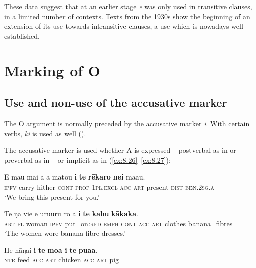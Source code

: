 {These data suggest that at an earlier stage \textit{e} was only used in transitive clauses, in a limited number of contexts. Texts from the 1930s show the beginning of an extension of its use towards intransitive clauses, a use which is nowadays well established.

\section{Marking of O}\label{sec:8.4}
\subsection{Use and non-use of the accusative marker}\label{sec:8.4.1}
The O argument is normally preceded by the accusative marker \textit{i}. With certain verbs, \textit{ki} is used as well (). 

The accusative marker is used whether A is expressed – postverbal as in  or preverbal as in  – or implicit as in (\ref{ex:8.26}–\ref{ex:8.27}):

\ea\label{ex:8.24}
\gll E ma{\ꞌ}u mai {\ꞌ}ā a mātou \textbf{i} \textbf{te} \textbf{rēkaro} \textbf{nei} mā{\ꞌ}au.\\
\textsc{ipfv} carry hither \textsc{cont} \textsc{prop} \textsc{1pl.excl} \textsc{acc} \textsc{art} present \textsc{dist} \textsc{ben.2sg.a}\\

\glt 
‘We bring this present for you.’ \textstyleExampleref{[R210.127]} 
\z

\ea\label{ex:8.25}
\gll Te ŋā vi{\ꞌ}e e uruuru rō {\ꞌ}ā \textbf{i} \textbf{te} \textbf{kahu} \textbf{kākaka}.\\
\textsc{art} \textsc{pl} woman \textsc{ipfv} put\_on:\textsc{red} \textsc{emph} \textsc{cont} \textsc{acc} \textsc{art} clothes banana\_fibres\\

\glt 
‘The women wore banana fibre dresses.’ \textstyleExampleref{[R210.132]} 
\z

\ea\label{ex:8.26}
\gll He hāŋai \textbf{i} \textbf{te} \textbf{moa} \textbf{i} \textbf{te} \textbf{pua{\ꞌ}a}.\\
\textsc{ntr} feed \textsc{acc} \textsc{art} chicken \textsc{acc} \textsc{art} pig\\

}
